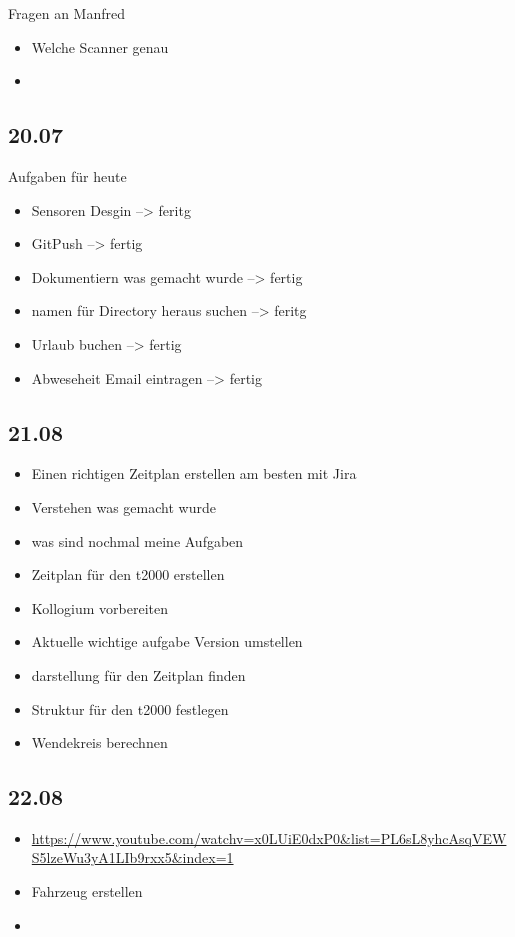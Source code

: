 Fragen an Manfred
\begin{itemize}
\item Welche Scanner genau
\item 
\end{itemize}


\subsection{20.07}

Aufgaben für heute
\begin{itemize}
\item Sensoren Desgin --> feritg
\item GitPush --> fertig
\item Dokumentiern was gemacht wurde --> fertig
\item namen für Directory heraus suchen --> feritg
\item Urlaub buchen --> fertig
\item Abweseheit Email eintragen --> fertig


\end{itemize}

\subsection{21.08}
\begin{itemize}
\item Einen richtigen Zeitplan erstellen am besten mit Jira
\item Verstehen was gemacht wurde
\item was sind nochmal meine Aufgaben
\item Zeitplan für den t2000 erstellen 
\item Kollogium vorbereiten 
\item Aktuelle wichtige aufgabe Version umstellen
\item darstellung für den Zeitplan finden
\item Struktur für den t2000 festlegen
\item Wendekreis berechnen
\end{itemize}

\subsection{22.08}
\begin{itemize}
\item \url{https://www.youtube.com/watchv=x0LUiE0dxP0&list=PL6sL8yhcAsqVEWS5lzeWu3yA1LIb9rxx5&index=1}
\item Fahrzeug erstellen
\item 
\end{itemize}


